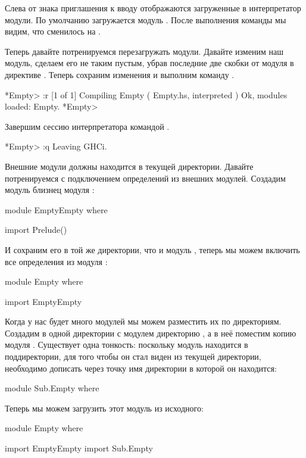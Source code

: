 Слева от знака приглашения к вводу \In{>} отображаются
загруженные в интерпретатор модули. По умолчанию 
загружается модуль . После выполнения команды 
мы видим, что  сменилось на .

Теперь давайте потренируемся перезагружать модули. 
Давайте изменим наш модуль, сделаем его не таким пустым,
убрав последние две скобки от модуля  в
директиве . Теперь сохраним изменения
и выполним команду .


\begin{code}
*Empty> :r
[1 of 1] Compiling Empty            ( Empty.hs, interpreted )
Ok, modules loaded: Empty.
*Empty>
\end{code}


Завершим сессию интерпретатора командой .


\begin{code}
*Empty> :q
Leaving GHCi.
\end{code}

Внешние модули должны находится в текущей директории.
Давайте потренируемся с подключением определений из
внешних модулей. Создадим модуль близнец модуля
:

\begin{code}
module EmptyEmpty where

import Prelude()
\end{code}

И сохраним его в той же директории, что и модуль
, теперь мы можем включить все определения
из модуля :

\begin{code}
module Empty where

import EmptyEmpty
\end{code}

Когда у нас будет много модулей мы можем разместить их
по директориям. Создадим в одной директории с модулем 
 директорию , а в неё поместим 
копию модуля . Существует одна тонкость:
поскольку модуль находится в поддиректории, для того чтобы
он стал виден из текущей директории, необходимо дописать
через точку имя директории в которой он находится:

\begin{code}
module Sub.Empty where
\end{code}

Теперь мы можем загрузить этот модуль из исходного:

\begin{code}
module Empty where

import EmptyEmpty
import Sub.Empty
\end{code}

